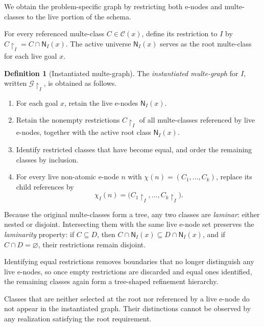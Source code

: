 \documentclass[sigconf,nonacm]{acmart}
\theoremstyle{definition}
\newtheorem{definition}{Definition}[section]
\theoremstyle{plain}
\theoremstyle{remark}
\begin{document}
We obtain the problem-specific graph by restricting both e-nodes and
multe-classes to the live portion of the schema.

For every referenced multe-class \(C\in\mathcal C(x)\),
define its restriction to \(I\) by
\(C\!\restriction_I = C\cap\mathsf N_I(x)\).
The active universe \(\mathsf N_I(x)\)
serves as the root multe-class for each live goal \(x\).

\begin{definition}[Instantiated multe-graph]
The \emph{instantiated multe-graph} for \(I\), written
\(\mathcal G\!\restriction_I\),
is obtained as follows.

\begin{enumerate}

\item
For each goal \(x\), retain the live e-nodes \(\mathsf N_I(x)\).

\item
Retain the nonempty restrictions \(C\!\restriction_I\)
of all multe-classes referenced by live e-nodes, together with the
active root class \(\mathsf N_I(x)\).

\item
Identify restricted classes that have become equal, and order the
remaining classes by inclusion.

\item
For every live non-atomic e-node \(n\) with
\(\chi(n)=(C_1,\ldots,C_k)\),
replace its child references by
\[
\chi_I(n)
=
\bigl(
C_1\!\restriction_I,\ldots,
C_k\!\restriction_I
\bigr).
\]

\end{enumerate}
\end{definition}

Because the original multe-classes form a tree, any two classes are
\emph{laminar}: either nested or disjoint.  Intersecting them with the same live
e-node set preserves the \emph{laminarity} property: if
\(C\subseteq D\), then
\(C\cap\mathsf N_I(x) \subseteq D\cap\mathsf N_I(x)\),
and if \(C\cap D=\varnothing\), their restrictions remain disjoint.

Identifying equal restrictions removes boundaries that no longer
distinguish any live e-nodes, so once empty restrictions are discarded
and equal ones identified, the remaining classes again form a
tree-shaped refinement hierarchy.

Classes that are neither selected at the root nor referenced by a live
e-node do not appear in the instantiated graph.  Their distinctions
cannot be observed by any realization satisfying the root requirement.
\end{document}
